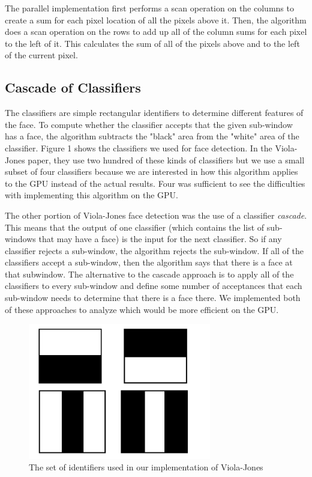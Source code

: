 \documentclass[12pt] {article}
\begin{document}
The parallel implementation first performs a scan operation on the columns to create a sum for each pixel location of all the pixels above it. Then, the algorithm does a scan operation on the rows to add up all of the column sums for each pixel to the left of it. This calculates the sum of all of the pixels above and to the left of the current pixel.


\subsection{Cascade of Classifiers}
The classifiers are simple rectangular identifiers to determine different features of the face. To compute whether the classifier accepts that the given sub-window has a face, the algorithm subtracts the "black" area from the "white" area of the classifier. Figure 1 shows the classifiers we used for face detection. In the Viola-Jones paper, they use two hundred of these kinds of classifiers but we use a small subset of four classifiers because we are interested in how this algorithm applies to the GPU instead of the actual results. Four was sufficient to see the difficulties with implementing this algorithm on the GPU.

The other portion of Viola-Jones face detection was the use of a classifier \emph{cascade}. This means that the output of one classifier (which contains the list of sub-windows that may have a face) is the input for the next classifier. So if any classifier rejects a sub-window, the algorithm rejects the sub-window. If all of the classifiers accept a sub-window, then the algorithm says that there is a face at that subwindow. The alternative to the cascade approach is to apply all of the classifiers to every sub-window and define some number of acceptances that each sub-window needs to determine that there is a face there. We implemented both of these approaches to analyze which would be more efficient on the GPU.
\begin{figure}[h!]
	\centering
		\includegraphics[width=80mm]{classifiers.pdf}
		\caption{The set of identifiers used in our implementation of Viola-Jones}
\end{figure}
\end{document}
